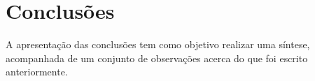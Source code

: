 

\chapter{Conclusões}
\label{ch:conclusoes}

A apresentação das conclusões tem como objetivo realizar uma síntese, acompanhada de um conjunto de observações acerca do que foi escrito anteriormente.
